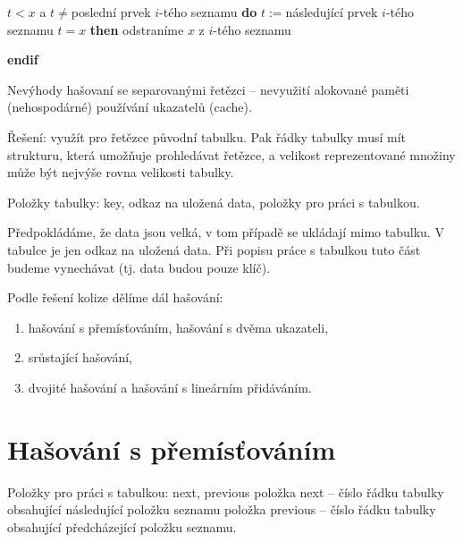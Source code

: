 \documentclass[a4paper,12pt]{article}
\begin{document}
\phantom{---}{\bf while} $t<x$ a $t\ne$poslední prvek $i$-tého seznamu {\bf do}\newline 
\phantom{------}$t:=$následující prvek $i$-tého seznamu\newline 
\phantom{---}{\bf enddo\newline 
endif\newline 
if} $t=x$ {\bf then} odstraníme $x$ z $i$-tého seznamu {\bf endif


}
Nevýhody hašovaní se separovanými řetězci --\newline 
\phantom{---}nevyužití alokované paměti (nehospodárné)\newline 
\phantom{---}používání ukazatelů (cache).\newline 

Řešení: využít pro řetězce původní tabulku. Pak řádky tabulky musí mít strukturu, která umožňuje prohledávat řetězce, a velikost reprezentované množiny 
může být nejvýše rovna velikosti tabulky.  

Položky tabulky:\newline 
\phantom{---}key,\newline 
\phantom{---}odkaz na uložená data,\newline 
\phantom{---}položky pro práci s tabulkou.

Předpokládáme, že data jsou velká, v tom případě se 
ukládají mimo tabulku. V tabulce je jen odkaz na uložená data. 
Při popisu práce s tabulkou tuto část budeme vynechávat (tj. 
data budou pouze klíč).

Podle řešení kolize dělíme dál hašování:
\begin{enumerate}
\item 
hašování s přemísťováním, hašování s dvěma 
ukazateli, 
\item 
srůstající hašování,
\item 
dvojité hašování a hašování s lineárním 
přidáváním.
\end{enumerate}

\section{Hašování s přemísťováním}

Položky pro práci s tabulkou: next, previous\newline 
\phantom{---}položka next -- číslo řádku tabulky 
obsahující následující polož\-ku seznamu\newline 
\phantom{---}položka previous -- číslo řádku tabulky obsahující 
předcházející položku seznamu.
\end{document}
